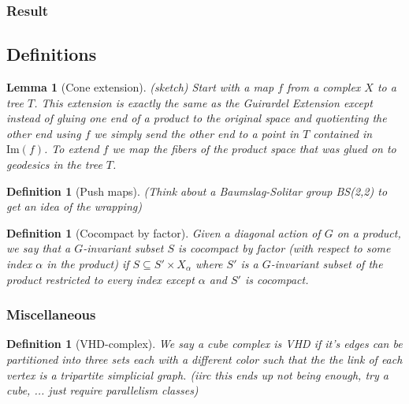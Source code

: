 \documentclass{article}
\theoremstyle{mystyle}
\newtheorem{lem}[thm]{Lemma}
\newtheorem{defn}[thm]{Definition}
\theoremstyle{remark}
\begin{document}
\subsubsection{Result}




\subsection{Definitions}


\begin{lem}
    [Cone extension]
    \label{lem:coneextension}
    (sketch)
    Start with a map $f$ from a complex $X$ to a tree $T$. This extension is exactly the same as the Guirardel Extension except instead of gluing one end of a product to the original space and quotienting the other end using $f$ we simply send the other end to a point in $T$ contained in \(\text{Im}(f)\). To extend $f$ we map the fibers of the product space that was glued on to geodesics in the tree $T$.
\end{lem}

\begin{defn}
    [Push maps]
    \label{defn:pushmaps}
    (Think about a Baumslag-Solitar group BS(2,2) to get an idea of the wrapping)
\end{defn}

\begin{defn}
    [Cocompact by factor]
    \label{defn:cocompactcrossfactor} 
    Given a diagonal action of \(G\) on a product, we say that a \(G\)-invariant subset \(S\) is cocompact by factor (with respect to some index \(\alpha\) in the product) if \(S \subseteq  S' \times X_{\alpha}\) where \(S'\) is a \(G\)-invariant subset of the product restricted to every index except \(\alpha\) and \(S'\) is cocompact.
\end{defn}



\subsubsection{Miscellaneous}

\begin{defn}
    [VHD-complex]
    \label{defn:vhd} 
    We say a cube complex is VHD if it's edges can be partitioned into three sets each with a different color such that the the link of each vertex is a tripartite simplicial graph. (iirc this ends up not being enough, try a cube, ... just require parallelism classes)
\end{defn}
\end{document}
